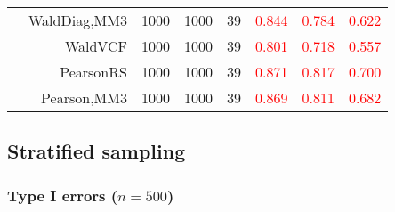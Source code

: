 \documentclass[
]{article}
\begin{document}
\begin{table}[H]
{\begin{tabular}[t]{lrrrrrrr}
\hspace{1em} & WaldDiag,MM3 & 1000 & 1000 & 39 & \textcolor{red}{0.844} & \textcolor{red}{0.784} & \textcolor{red}{0.622}\\

\hspace{1em} & WaldVCF & 1000 & 1000 & 39 & \textcolor{red}{0.801} & \textcolor{red}{0.718} & \textcolor{red}{0.557}\\

\hspace{1em} & PearsonRS & 1000 & 1000 & 39 & \textcolor{red}{0.871} & \textcolor{red}{0.817} & \textcolor{red}{0.700}\\

\hspace{1em} & Pearson,MM3 & 1000 & 1000 & 39 & \textcolor{red}{0.869} & \textcolor{red}{0.811} & \textcolor{red}{0.682}\\
\bottomrule
\end{tabular}}
\endgroup{}
\end{table}

\hypertarget{stratified-sampling}{%
\subsection{Stratified sampling}\label{stratified-sampling}}

\hypertarget{type-i-errors-n500-1}{%
\subsubsection{\texorpdfstring{Type I errors
(\(n=500\))}{Type I errors (n=500)}}\label{type-i-errors-n500-1}}
\end{document}
